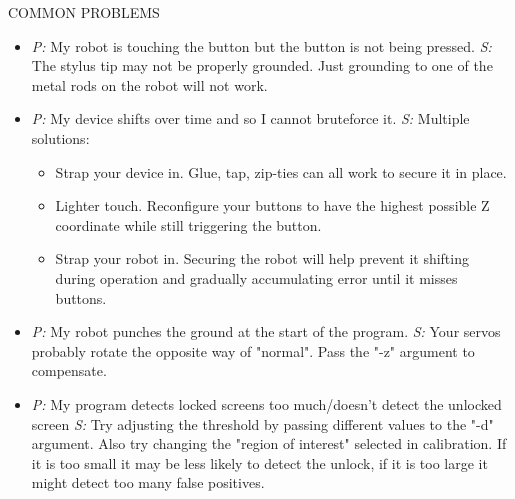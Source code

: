 \documentclass[a4paper,12pt]{letter}
\begin{document}
COMMON PROBLEMS
\begin{itemize}
\item \emph{P:} My robot is touching the button but the button is not being pressed.
\emph{S:} The stylus tip may not be properly grounded. Just grounding to one of the metal rods on the robot will not work.
\item \emph{P:} My device shifts over time and so I cannot bruteforce it.
\emph{S:} Multiple solutions: 
\begin{itemize}
\item Strap your device in. Glue, tap, zip-ties can all work to secure it in place. 
\item Lighter touch. Reconfigure your buttons to have the highest possible Z coordinate while still triggering the button.
\item Strap your robot in. Securing the robot will help prevent it shifting during operation and gradually accumulating error until it misses buttons.
\end{itemize}
\item \emph{P:} My robot punches the ground at the start of the program.
\emph{S:} Your servos probably rotate the opposite way of "normal". Pass the "-z" argument to compensate.
\item \emph{P:} My program detects locked screens too much/doesn't detect the unlocked screen
\emph{S:} Try adjusting the threshold by passing different values to the "-d" argument. Also try changing the "region of interest" selected in calibration. If it is too small it may be less likely to detect the unlock, if it is too large it might detect too many false positives.
\end{itemize}
\end{document}

